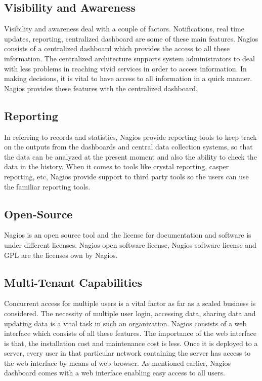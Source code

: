 \documentclass[9pt,twocolumn,twoside]{styles/osajnl}
\begin{document}
\subsection{Visibility and Awareness}

Visibility and awareness deal with a couple of factors. Notifications,
real time updates, reporting, centralized dashboard are some of these
main features. Nagios consists of a centralized dashboard which
provides the access to all these information. The centralized
architecture supports system administrators to deal with less problems
in reaching vivid services in order to access information. In making
decisions, it is vital to have access to all information in a quick
manner.  Nagios provides these features with the centralized
dashboard.

\subsection{Reporting}

In referring to records and statistics, Nagios provide reporting tools
to keep track on the outputs from the dashboards and central
data collection systems, so that the data can be analyzed at the
present moment and also the ability to check the data in the history.
When it comes to tools like crystal reporting, casper
reporting, etc, Nagios provide support to third party tools so the
users can use the familiar reporting tools.

\subsection{Open-Source}

Nagios is an open source tool and the license for documentation and software
is under different licenses. Nagios open software license, Nagios software
license and GPL are the licenses own by Nagios. 

\subsection{Multi-Tenant Capabilities}

Concurrent access for multiple users is a vital factor as far as
a scaled business is considered. The necessity of multiple user login,
accessing data, sharing data and updating data is a vital task in such
an organization. Nagios consists of a web interface which consists of
all these features. The importance of the web interface is that,
the installation cost and maintenance cost is less. Once it is deployed
to a server, every user in that particular network containing the server
has access to the web interface by means of web browser. As mentioned earlier,
Nagios dashboard comes with a web interface enabling easy access to all users.
\end{document}
